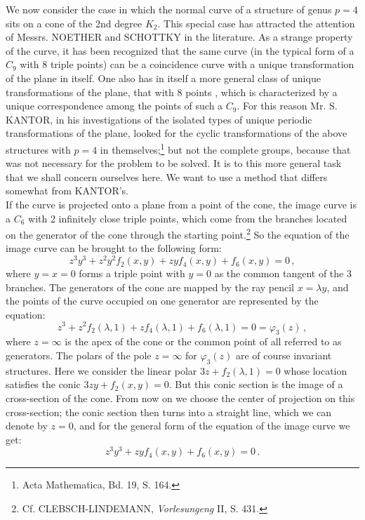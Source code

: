 \documentclass[leqno]{article}
\begin{document}
We now consider the case in which the normal curve of a structure of genus $p=4$ sits on a cone of the 2nd degree $K_2$. This special case has attracted the attention of Messrs. NOETHER and SCHOTTKY in the literature. As a strange property of the curve, it has been recognized that the same curve (in the typical form of a $C_9$ with 8 triple points) can be a coincidence curve with a unique transformation of the plane in itself. One also has in itself a more general class of unique transformations of the plane, that \guillemotright with 8 points \guillemotright, which is characterized by a unique correspondence among the points  of such a $C_9$. For this reason Mr. S. KANTOR, in his investigations of the isolated types of unique periodic transformations of the plane, looked for the cyclic transformations of the above structures with $p=4$ in themselves;\footnote{Acta Mathematica, Bd. 19, S. 164.} but not the complete groups, because that was not necessary for the problem to be solved. It is to this more general task that we shall concern ourselves here. We want to use a method that differs somewhat from KANTOR's. \\
If the curve is projected onto a plane from a point of the cone, the image curve is a $C_6$ with 2 infinitely close triple points, which come from the branches located on the generator of the cone through the starting point.\footnote{Cf. CLEBSCH-LINDEMANN, \textit{Vorlesungeng} II, S. 431.} So the equation of the image curve can be brought to the following form: 
\[
z^3 y^3 + z^2 y^2 f_2(x,y) + zy f_4(x,y)+ f_6(x,y) = 0 \, , 
\]
where $y=x=0$ forms a triple point with $y=0$ as the common tangent of the 3 branches. The generators of the cone are mapped by the ray pencil $x=\lambda y$, and the points of the curve occupied on one generator are represented by the equation: 
\[
z^3 + z^2 f_2(\lambda, 1) + z f_4(\lambda, 1) + f_6(\lambda, 1) = 0 = \varphi_3(z) \, , 
\] 
where $z=\infty$ is the apex of the cone or the common point of all referred to as generators. The polars of the pole $z=\infty$ for $\varphi_3(z)$ are of course invariant structures. Here we consider the linear polar $3z + f_2(\lambda, 1)=0$ whose location satisfies the conic $3zy+f_2(x,y)=0$. But this conic section is the image of a cross-section of the cone. From now on we choose the center of projection on this cross-section; the conic section then turns into a straight line, which we can denote by $z=0$, and for the general form of the equation of the image curve we get:
\begin{equation}\label{eq: 8.I}
z^3 y^3 + zy f_4(x,y) + f_6(x,y) = 0 \, . \tag{I}
\end{equation}
\end{document}
